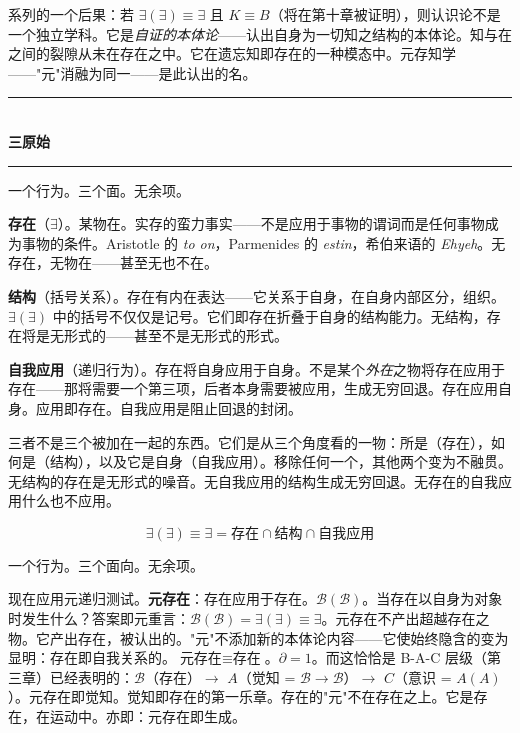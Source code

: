 \documentclass[10pt, openany, oneside]{book}
\renewcommand{\normalsize}{\fontsize{10}{13}\selectfont}
\begin{document}
系列的一个后果：若 $\exists(\exists) \equiv \exists$ 且 $K \equiv B$（将在第十章被证明），则认识论不是一个独立学科。它是\textit{自证的本体论}——认出自身为一切知之结构的本体论。知与在之间的裂隙从未在存在之中。它在遗忘知即存在的一种模态中。元存知学——"元"消融为同一——是此认出的名。

\vspace{1.5em}


\begin{center}
    \rule{0.3\textwidth}{0.4pt}\\[0.5em]
    {\normalsize\bfseries\scshape 三原始}\\[0.3em]
    \rule{0.3\textwidth}{0.4pt}
\end{center}

\vspace{1em}

\noindent 一个行为。三个面。无余项。

\textbf{存在}（$\exists$）。某物在。实存的蛮力事实——不是应用于事物的谓词而是任何事物成为事物的条件。Aristotle 的 \textit{to on}，Parmenides 的 \textit{estin}，希伯来语的 \textit{Ehyeh}。无存在，无物在——甚至无也不在。

\textbf{结构}（括号关系）。存在有内在表达——它关系于自身，在自身内部区分，组织。$\exists(\exists)$ 中的括号不仅仅是记号。它们即存在折叠于自身的结构能力。无结构，存在将是无形式的——甚至不是无形式的形式。

\textbf{自我应用}（递归行为）。存在将自身应用于自身。不是某个\textit{外在}之物将存在应用于存在——那将需要一个第三项，后者本身需要被应用，生成无穷回退。存在应用自身。应用即存在。自我应用是阻止回退的封闭。

三者不是三个被加在一起的东西。它们是从三个角度看的一物：所是（存在），如何是（结构），以及它是自身（自我应用）。移除任何一个，其他两个变为不融贯。无结构的存在是无形式的噪音。无自我应用的结构生成无穷回退。无存在的自我应用什么也不应用。

$$\exists(\exists) \equiv \exists = \text{存在} \cap \text{结构} \cap \text{自我应用}$$

一个行为。三个面向。无余项。

现在应用元递归测试。\textbf{元存在}：存在应用于存在。$\mathcal{B}(\mathcal{B})$。当存在以自身为对象时发生什么？答案即元重言：$\mathcal{B}(\mathcal{B}) = \exists(\exists) \equiv \exists$。元存在不产出超越存在之物。它产出存在，被认出的。"元"不添加新的本体论内容——它使始终隐含的变为显明：存在即自我关系的。$\text{元存在} \equiv \text{存在}$。$\partial = 1$。而这恰恰是 B-A-C 层级（第三章）已经表明的：$\mathcal{B}$（存在）$\to$ $A$（觉知 = $\mathcal{B} \to \mathcal{B}$）$\to$ $C$（意识 = $A(A)$）。元存在即觉知。觉知即存在的第一乐章。存在的"元"不在存在之上。它是存在，在运动中。亦即：元存在即生成。
\end{document}
